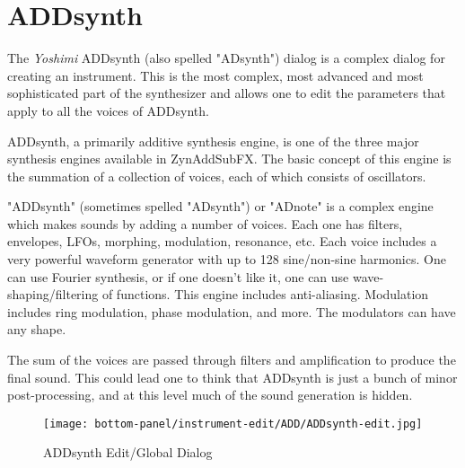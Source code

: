 %
%
%

\section{ADDsynth}
\label{sec:addsynth}

   The \textsl{Yoshimi} ADDsynth (also spelled "ADsynth")
   dialog is a complex dialog for creating an
   instrument.  This is the most complex, most advanced and most
   sophisticated part of the synthesizer and allows one to edit the
   parameters that apply to all the voices of ADDsynth.

   ADDsynth, a primarily additive synthesis engine, is one of the three major
   synthesis engines available in ZynAddSubFX. The basic concept of this
   engine is the summation of a collection of voices, each of which consists
   of oscillators.

   "ADDsynth" (sometimes spelled "ADsynth") or "ADnote" is a complex engine
   which makes sounds by adding a number of voices. Each one has filters,
   envelopes, LFOs, morphing, modulation, resonance, etc.
   Each voice includes a very powerful
   waveform generator with up to 128 sine/non-sine harmonics. One can use
   Fourier synthesis, or if one doesn't like it, one can use
   wave-shaping/filtering of functions. This engine includes anti-aliasing.
   Modulation includes ring modulation, phase modulation, and more.
   The modulators can have any shape.
   \cite{zyndoc}

   The sum of the voices are passed through filters and amplification to
   produce the final sound. This could lead one to think that ADDsynth is just
   a bunch of minor post-processing, and at this level much of the sound
   generation is hidden.

\begin{figure}[H]
   \centering 
   \texttt{[image: bottom-panel/instrument-edit/ADD/ADDsynth-edit.jpg]}
   \caption{ADDsynth Edit/Global Dialog}
   \label{fig:addsynth_edit_dialog}
\end{figure}

